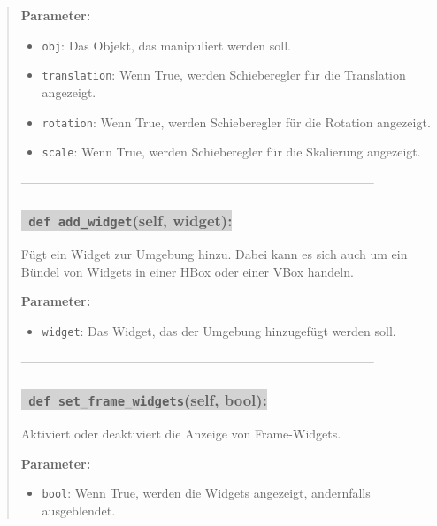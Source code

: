 \begin{quote}
    \noindent \textbf{Parameter:} \vspace{-6ex} \\
    \begin{itemize}
        \setlength{\itemindent}{1em}  %
        \item \texttt{obj}: Das Objekt, das manipuliert werden soll.
        \item \texttt{translation}: Wenn True, werden Schieberegler für die Translation angezeigt.
        \item \texttt{rotation}: Wenn True, werden Schieberegler für die Rotation angezeigt.
        \item \texttt{scale}: Wenn True, werden Schieberegler für die Skalierung angezeigt.
    \end{itemize}
    
    --------------------------------------------------------------------------------------
    
    
    \subsubsection*{\colorbox{lightgray}{\texttt{\textbf{\color{green} def} \color{blue} add\_widget}\textbf{(self, widget):}}}
    Fügt ein Widget zur Umgebung hinzu. Dabei kann es sich auch um ein Bündel von Widgets in einer HBox oder einer VBox handeln.
    
    \noindent \textbf{Parameter:} \vspace{-6ex} \\
    \begin{itemize}
        \setlength{\itemindent}{1em}  %
        \item \texttt{widget}: Das Widget, das der Umgebung hinzugefügt werden soll.
    \end{itemize}
    
    --------------------------------------------------------------------------------------
    


    \subsubsection*{\colorbox{lightgray}{\texttt{\textbf{\color{green} def} \color{blue} set\_frame\_widgets}\textbf{(self, bool):}}}
    Aktiviert oder deaktiviert die Anzeige von Frame-Widgets.

    \noindent \textbf{Parameter:} \vspace{-6ex} \\
    \begin{itemize}
        \setlength{\itemindent}{1em}  %
        \item \texttt{bool}: Wenn True, werden die Widgets angezeigt, andernfalls ausgeblendet.
    \end{itemize}


\end{quote}
